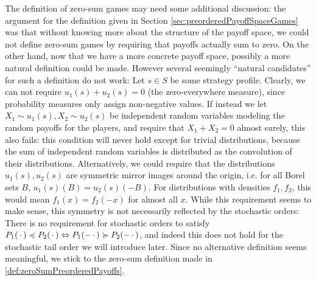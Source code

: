 \documentclass[a4paper]{scrreprt}
\begin{document}
    The definition of zero-sum games may need some additional discussion: the argument for the definition given in Section \ref{sec:preorderedPayoffSpaceGames} was that without knowing more about the structure of the payoff space, we could not define zero-sum games by requiring that payoffs actually sum to zero.
    On the other hand, now that we have a more concrete payoff space, possibly a more natural definition could be made.    
    However several seemingly “natural candidates” for such a definition do not work: Let $s \in S$ be some strategy profile.
    Clearly, we can not require $u_1(s) + u_2(s) = 0$ (the zero-everywhere measure), since probability measures only assign non-negative values.
    If instead we let $X_1 \sim u_1(s), X_2 \sim u_2(s)$ be independent random variables modeling the random payoffs for the players, and require that $X_1 + X_2 = 0$ almost surely, this also fails: this condition will never hold except for trivial distributions, because the sum of independent random variables is distributed as the convolution of their distributions.
    Alternatively, we could require that the distributions $u_1(s), u_2(s)$ are symmetric mirror images around the origin, i.e. for all Borel sets $B$, $u_1(s)(B) = u_2(s)(-B)$. For distributions with densities $f_1, f_2$, this would mean $f_1(x) = f_2(-x)$ for almost all $x$.
    While this requirement seems to make sense, this symmetry is not necessarily reflected by the stochastic orders: There is no requirement for stochastic orders to satisfy $P_1(\,\cdot\,) \preccurlyeq P_2(\,\cdot\,) \Leftrightarrow P_1(-\,\cdot\,) \succcurlyeq P_2(-\,\cdot\,)$, and indeed this does not hold for the stochastic tail order we will introduce later.
    Since no alternative definition seems meaningful, we stick to the zero-sum definition made in \ref{def:zeroSumPreorderedPayoffs}.
\end{document}
